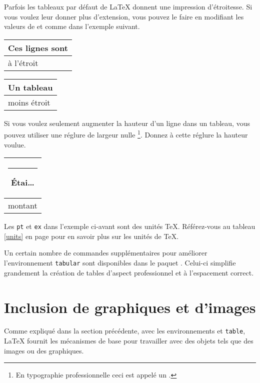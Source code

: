Parfois les tableaux par défaut de \LaTeX{} donnent une impression
d'étroitesse. Si vous voulez leur donner plus d'extension, vous pouvez
le faire en modifiant les valeurs de  et  comme
dans l'exemple suivant.

\begin{example}
\begin{tabular}{|l|}
\hline
Ces lignes sont\\\hline
à l'étroit\\\hline
\end{tabular}

{\renewcommand{\arraystretch}{1.5}
\renewcommand{\tabcolsep}{0.2cm}
\begin{tabular}{|l|}
\hline
Un tableau\\\hline
moins étroit\\\hline
\end{tabular}}

\end{example}

Si vous voulez seulement augmenter la hauteur d'un ligne dans un
tableau, vous pouvez utiliser une réglure de largeur nulle
\footnote{En typographie professionnelle ceci est appelé un
.}. Donnez à cette réglure la hauteur voulue.

\begin{example}
\begin{tabular}{|c|}
\hline
\rule{1pt}{4ex}\'Etai\dots\\
\hline
\rule{0pt}{4ex} montant \\
\hline
\end{tabular}
\end{example}

Les \texttt{pt} et \texttt{ex} dans l'exemple ci-avant sont des unités
\TeX. Référez-vous au tableau \ref{units} en page \pageref{units} pour
en savoir plus sur les unités de \TeX.

Un certain nombre de commandes supplémentaires pour améliorer
l'environnement \texttt{tabular} sont disponibles dans le paquet
. Celui-ci simplifie grandement la création de tables
d'aspect professionnel et à l'espacement correct.

\section{Inclusion de graphiques et d'images} \label{eps}

Comme expliqué dans la section précédente,
avec les environnements  et \texttt{table}, \LaTeX{}
fournit les mécanismes de base pour travailler avec des objets tels que
des images ou des graphiques.

